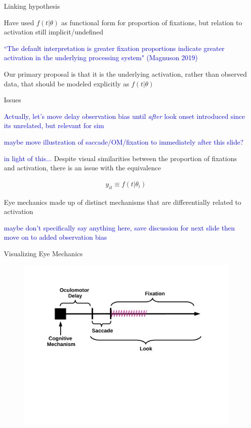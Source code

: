 \documentclass{beamer}
\newcommand{\vp}{\vspace{2mm}}
\providecommand{\cn}[1]{\textcolor{blue}{#1}}
\begin{document}
\begin{frame}{Linking hypothesis}\Large

Have used $f(t|\theta)$ as functional form for proportion of fixations, but relation to activation still implicit/undefined \vp

\cn{``The default interpretation is greater fixation proportions indicate greater activation in the underlying processing system" (Magnuson 2019)} \vp


Our primary proposal is that it is the underlying activation, rather than observed data, that should be modeled explicitly as $f(t|\theta)$ \vp


\end{frame}

\begin{frame}{Issues}

\cn{Actually, let's move delay observation bias until \textit{after} look onset introduced since its unrelated, but relevant for sim}

\cn{maybe move illustration of saccade/OM/fixation to immediately after this slide?}

\cn{in light of this...} Despite visual similarities between the proportion of fixations and activation, there is an issue with the equivalence

\begin{align*}
y_{it} \equiv f(t | \theta_i)
\end{align*}

Eye mechanics made up of distinct mechanisms that are differentially related to activation \vp

\cn{maybe don't specifically say anything here, save discussion for next slide then move on to added observation bias}

\end{frame}

\begin{frame}{Visualizing Eye Mechanics}
\vspace{-1mm}
\begin{figure}
\centering
\includegraphics[scale=0.45]{img/what_is_a_look.pdf}
\end{figure}
\end{frame}
\end{document}
